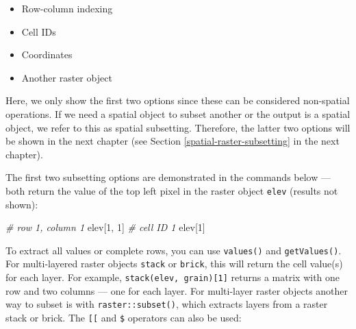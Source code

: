 \documentclass[]{krantz}
\newenvironment{Shaded}{\begin{snugshade}}{\end{snugshade}}
\newcommand{\CommentTok}[1]{\textcolor[rgb]{0.37,0.37,0.37}{\textit{#1}}}
\newcommand{\DecValTok}[1]{\textcolor[rgb]{0.06,0.06,0.06}{#1}}
\newcommand{\KeywordTok}[1]{\textcolor[rgb]{0.27,0.27,0.27}{\textbf{#1}}}
\newcommand{\NormalTok}[1]{#1}
\newcommand{\OperatorTok}[1]{\textcolor[rgb]{0.43,0.43,0.43}{\textbf{#1}}}
\newcommand{\StringTok}[1]{\textcolor[rgb]{0.5,0.5,0.5}{#1}}
\providecommand{\tightlist}{%
  \setlength{\itemsep}{0pt}\setlength{\parskip}{0pt}}
\begin{document}
\begin{itemize}
\tightlist
\item
  Row-column indexing
\item
  Cell IDs
\item
  Coordinates
\item
  Another raster object
\end{itemize}

Here, we only show the first two options since these can be considered non-spatial operations.
If we need a spatial object to subset another or the output is a spatial object, we refer to this as spatial subsetting.
Therefore, the latter two options will be shown in the next chapter (see Section \ref{spatial-raster-subsetting} in the next chapter).

The first two subsetting options are demonstrated in the commands below ---
both return the value of the top left pixel in the raster object \texttt{elev} (results not shown):

\begin{Shaded}
\begin{Highlighting}[]
\CommentTok{# row 1, column 1}
\NormalTok{elev[}\DecValTok{1}\NormalTok{, }\DecValTok{1}\NormalTok{]}
\CommentTok{# cell ID 1}
\NormalTok{elev[}\DecValTok{1}\NormalTok{]}
\end{Highlighting}
\end{Shaded}

To extract all values or complete rows, you can use \texttt{values()} and \texttt{getValues()}.
For multi-layered raster objects \texttt{stack} or \texttt{brick}, this will return the cell value(s) for each layer.
For example, \texttt{stack(elev,\ grain){[}1{]}} returns a matrix with one row and two columns --- one for each layer.
For multi-layer raster objects another way to subset is with \texttt{raster::subset()}, which extracts layers from a raster stack or brick. The \texttt{{[}{[}} and \texttt{\$} operators can also be used:

\begin{Shaded}
\end{Shaded}
\end{document}

